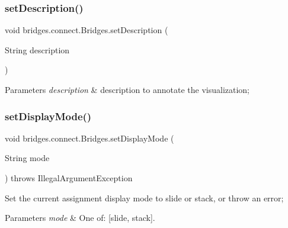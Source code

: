\mbox{\label{classbridges_1_1connect_1_1_bridges_a50d1d5aa64d312393b63d1be854e34a2}} 
\subsubsection{\texorpdfstring{set\+Description()}{setDescription()}}
{\footnotesize\ttfamily void bridges.\+connect.\+Bridges.\+set\+Description (\begin{DoxyParamCaption}\item[{String}]{description }\end{DoxyParamCaption})}


\begin{DoxyParams}{Parameters}
{\em description} & description to annotate the visualization; \\
\hline
\end{DoxyParams}
\mbox{\label{classbridges_1_1connect_1_1_bridges_aaa1a44a689daa26a841d0e8d31839861}} 
\subsubsection{\texorpdfstring{set\+Display\+Mode()}{setDisplayMode()}}
{\footnotesize\ttfamily void bridges.\+connect.\+Bridges.\+set\+Display\+Mode (\begin{DoxyParamCaption}\item[{String}]{mode }\end{DoxyParamCaption}) throws Illegal\+Argument\+Exception}

Set the current assignment display mode to slide or stack, or throw an error; 
\begin{DoxyParams}{Parameters}
{\em mode} & One of\+: \mbox{[}\textquotesingle{}slide\textquotesingle{}, \textquotesingle{}stack\textquotesingle{}\mbox{]}. \\
\hline
\end{DoxyParams}
\mbox{\label{classbridges_1_1connect_1_1_bridges_ab69e89ec7d2e674a8b8c4b0be0c63397}} 
